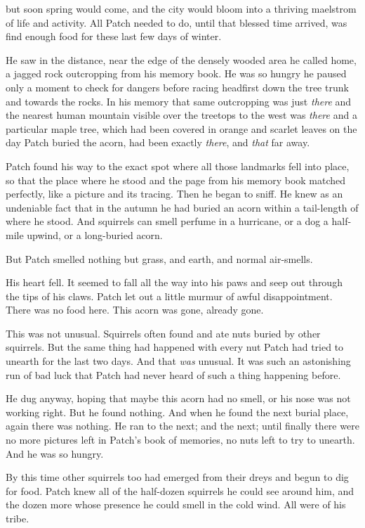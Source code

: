 \documentclass[11pt]{article}
\begin{document}
 but soon spring would come, and the city would bloom into a thriving maelstrom of life and activity. All Patch needed to do, until that blessed time arrived, was find enough food for these last few days of winter.\par
 He saw in the distance, near the edge of the densely wooded area he called home, a jagged rock outcropping from his memory book. He was so hungry he paused only a moment to check for dangers before racing headfirst down the tree trunk and towards the rocks. In his memory that same outcropping was just {\it there} %
 and the nearest human mountain visible over the treetops to the west was {\it there} %
 and a particular maple tree, which had been covered in orange and scarlet leaves on the day Patch buried the acorn, had been exactly {\it there}, and {\it that} far away.\par
Patch found his way to the exact spot where all those landmarks fell into place, so that the place where he stood and the page from his memory book matched perfectly, like a picture and its tracing. Then he began to sniff. He knew as an undeniable fact that in the autumn he had buried an acorn within a tail-length of where he stood. And squirrels can smell perfume in a hurricane, or a dog a half-mile upwind, or a long-buried acorn.\par
But Patch smelled nothing but grass, and earth, and normal air-smells.\par
His heart fell. It seemed to fall all the way into his paws and seep out through the tips of his claws. Patch let out a little murmur of awful disappointment. There was no food here. This acorn was gone, already gone.\par
This was not unusual. Squirrels often found and ate nuts buried by other squirrels. But the same thing had happened with every nut Patch had tried to unearth for the last two days. And that {\it was} unusual. It was such an astonishing run of bad luck that Patch had never heard of such a thing happening before.\par
He dug anyway, hoping that maybe this acorn had no smell, or his nose was not working right. But he found nothing. And when he found the next burial place, again there was nothing. He ran to the next; and the next; until finally there were no more pictures left in Patch's book of memories, no nuts left to try to unearth. And he was so hungry.\par
By this time other squirrels too had emerged from their dreys and begun to dig for food. Patch knew all of the half-dozen squirrels he could see around him, and the dozen more whose presence he could smell in the cold wind. All were of his tribe.\par
\end{document}
